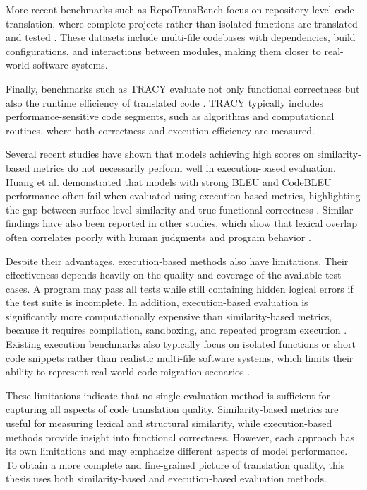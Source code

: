 More recent benchmarks such as RepoTransBench focus on repository-level code
translation, where complete projects rather than isolated functions are
translated and tested \cite{repotransbench}. These datasets include multi-file
codebases with dependencies, build configurations, and interactions between
modules, making them closer to real-world software systems.

Finally, benchmarks such as TRACY evaluate not only functional correctness but
also the runtime efficiency of translated code \cite{tracy_benchmark}. TRACY
typically includes performance-sensitive code segments, such as algorithms and
computational routines, where both correctness and execution efficiency are
measured.

Several recent studies have shown that models achieving high scores on
similarity-based metrics do not necessarily perform well in execution-based
evaluation. Huang et al. demonstrated that models with strong BLEU and
CodeBLEU performance often fail when evaluated using execution-based metrics,
highlighting the gap between surface-level similarity and true functional
correctness \cite{huang2022exeds}. Similar findings have also been reported in
other studies, which show that lexical overlap often correlates poorly with
human judgments and program behavior \cite{evtikhiev2022bleu,
tran2019ruby}.

Despite their advantages, execution-based methods also have limitations. Their
effectiveness depends heavily on the quality and coverage of the available test
cases. A program may pass all tests while still containing hidden logical
errors if the test suite is incomplete. In addition, execution-based evaluation
is significantly more computationally expensive than similarity-based metrics,
because it requires compilation, sandboxing, and repeated program execution
\cite{huang2022exeds}. Existing execution benchmarks also typically focus on
isolated functions or short code snippets rather than realistic multi-file
software systems, which limits their ability to represent real-world code
migration scenarios \cite{evaluation_limitations, llm_limitations}.

These limitations indicate that no single evaluation method is sufficient for
capturing all aspects of code translation quality. Similarity-based metrics are
useful for measuring lexical and structural similarity, while execution-based
methods provide insight into functional correctness. However, each approach has
its own limitations and may emphasize different aspects of model performance. To
obtain a more complete and fine-grained picture of translation quality, this
thesis uses both similarity-based and execution-based evaluation methods.